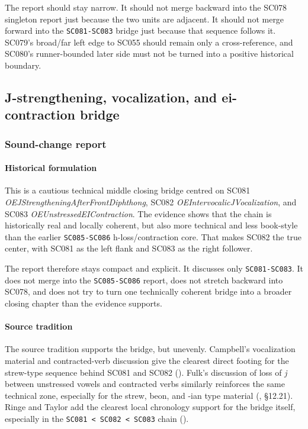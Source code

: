 \documentclass[
  british,
  a4paper,
]{article}
\begin{document}
The report should stay narrow. It should not merge backward into the
SC078 singleton report just because the two units are adjacent. It
should not merge forward into the \texttt{SC081-SC083} bridge just
because that sequence follows it. SC079's broad/far left edge to SC055
should remain only a cross-reference, and SC080's runner-bounded later
side must not be turned into a positive historical boundary.

\subsection{J-strengthening, vocalization, and ei-contraction
bridge}\label{j-strengthening-vocalization-and-ei-contraction-bridge}

\subsubsection{Sound-change report}\label{sound-change-report-50}

\paragraph{Historical formulation}\label{historical-formulation-50}

This is a cautious technical middle closing bridge centred on SC081
\emph{OEJStrengtheningAfterFrontDiphthong}, SC082
\emph{OEIntervocalicJVocalization}, and SC083
\emph{OEUnstressedEIContraction}. The evidence shows that the chain is
historically real and locally coherent, but also more technical and less
book-style than the earlier \texttt{SC085-SC086} h-loss/contraction
core. That makes SC082 the true center, with SC081 as the left flank and
SC083 as the right follower.

The report therefore stays compact and explicit. It discusses only
\texttt{SC081-SC083}. It does not merge into the \texttt{SC085-SC086}
report, does not stretch backward into SC078, and does not try to turn
one technically coherent bridge into a broader closing chapter than the
evidence supports.

\paragraph{Source tradition}\label{source-tradition-50}

The source tradition supports the bridge, but unevenly. Campbell's
vocalization material and contracted-verb discussion give the clearest
direct footing for the strew-type sequence behind SC081 and SC082
().
Fulk's discussion of loss of \emph{j} between unstressed vowels and
contracted verbs similarly reinforces the same technical zone,
especially for the strew, beon, and -ian type material
(, §12.21). Ringe and
Taylor add the clearest local chronology support for the bridge itself,
especially in the \texttt{SC081\ \textless{}\ SC082\ \textless{}\ SC083}
chain ().
\end{document}
